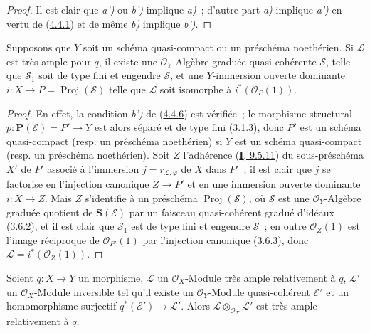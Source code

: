 \begin{proof}
Il est clair que \emph{a')} ou \emph{b')} implique \emph{a)}~; d'autre part \emph{a)} implique \emph{a')} en
vertu de (\hyperref[II.4.4.1-fr]{4.4.1}) et de même \emph{b)} implique \emph{b')}.
\end{proof}

\begin{corollary}[4.4.7]
\label{II.4.4.7-fr}
Supposons que $Y$ soit un schéma quasi-compact ou un préschéma noethérien. Si
$\mathcal{L}$ est très ample pour $q$, il existe une $\mathcal{O}_Y$-Algèbre
graduée quasi-cohérente $\mathcal{S}$, telle que $\mathcal{S}_1$ soit de type
fini et engendre $\mathcal{S}$, et une $Y$-immersion \textup{ouverte dominante}
$i:X\to P=\operatorname{Proj}(\mathcal{S})$ telle que $\mathcal{L}$ soit
isomorphe à $i^*(\mathcal{O}_P(1))$.
\end{corollary}

\begin{proof}
En effet, la condition \emph{b')} de (\hyperref[II.4.4.6-fr]{4.4.6}) est vérifiée~;
le morphisme structural $p:\mathbf{P}(\mathcal{E})=P'\to Y$ est alors séparé
et de type fini (\hyperref[II.3.1.3-fr]{3.1.3}), donc $P'$ est un schéma
quasi-compact (resp. un préschéma noethérien) si $Y$ est un schéma
quasi-compact (resp. un préschéma noethérien). Soit $Z$ l'adhérence
(\hyperref[I.9.5.11-fr]{\textbf{I}, 9.5.11}) du sous-préschéma $X'$ de $P'$ associé à
l'immersion $j=r_{\mathcal{L},\varphi}$ de $X$ dans $P'$~; il est clair que
$j$ se factorise en l'injection canonique $Z\to P'$ et en une immersion
ouverte dominante $i:X\to Z$. Mais $Z$ s'identifie à un préschéma
$\operatorname{Proj}(\mathcal{S})$, où $\mathcal{S}$ est une
$\mathcal{O}_Y$-Algèbre graduée quotient de $\mathbf{S}(\mathcal{E})$ par un
faisceau quasi-cohérent gradué d'idéaux
(\hyperref[II.3.6.2-fr]{3.6.2}), et il est clair que $\mathcal{S}_1$ est de
type fini et engendre $\mathcal{S}$~; en outre $\mathcal{O}_Z(1)$ est l'image
réciproque de $\mathcal{O}_{P'}(1)$ par l'injection canonique
(\hyperref[II.3.6.3-fr]{3.6.3}), donc
$\mathcal{L}=i^*(\mathcal{O}_Z(1))$.
\end{proof}

\begin{proposition}[4.4.8]
\label{II.4.4.8-fr}
Soient $q:X\to Y$ un morphisme, $\mathcal{L}$ un $\mathcal{O}_X$-Module très
ample relativement à $q$, $\mathcal{L}'$ un $\mathcal{O}_X$-Module inversible
tel qu'il existe un $\mathcal{O}_Y$-Module quasi-cohérent $\mathcal{E}'$ et un
homomorphisme surjectif $q^*(\mathcal{E}')\to\mathcal{L}'$. Alors
$\mathcal{L}\otimes_{\mathcal{O}_X}\mathcal{L}'$ est très ample relativement
à $q$.
\end{proposition}

